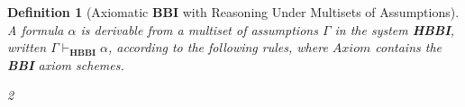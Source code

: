 \documentclass[a4paper]{article}
\newtheorem{definition}[theorem]{Definition}
\newcommand\magicwand{\mathrel{-\mkern-6mu*}}
\newcommand{\BBI}{\textbf{BBI}\xspace}
\begin{document}
\begin{definition}[Axiomatic \BBI with Reasoning Under Multisets of Assumptions]
     A formula $\alpha$ is derivable from a multiset of assumptions $\Gamma$ in the system \textbf{HBBI}, written $\Gamma \vdash_{\textbf{HBBI}} \alpha$, according to the following rules, where $Axiom$ contains the \BBI axiom schemes.
\begin{enumerate}
\begin{multicols}{2}


\item \AxiomC{$\alpha \in \Gamma $}
\UnaryInfC{$\Gamma \vdash \alpha$}

\DisplayProof

\vspace{0.5em}
\item {}
\UnaryInfC{$\Gamma \vdash \alpha$}

\DisplayProof

\vspace{0.5em}
\item \AxiomC{$\Gamma \vdash \alpha $}
\AxiomC{$\Delta \vdash \alpha \rightarrow \beta$}

\BinaryInfC{$\Gamma; \Delta \vdash \beta$}

\DisplayProof


\item \AxiomC{$ \vdash \alpha \rightarrow \gamma $}
\AxiomC{$ \vdash \beta \rightarrow \delta$}

\BinaryInfC{$\Gamma \vdash (\alpha * \beta) \rightarrow (\gamma * \delta)$}

\DisplayProof

\vspace{0.5em}
\item \AxiomC{$ \Gamma \vdash \alpha \rightarrow (\beta \magicwand \gamma)$}
\UnaryInfC{$\Gamma \vdash (\alpha *\beta) \rightarrow \gamma$}

\DisplayProof

\vspace{0.5em}
\item \AxiomC{$ \Gamma\vdash (\alpha *\beta) \rightarrow \gamma$}
\UnaryInfC{$\Gamma \vdash \alpha \rightarrow (\beta \magicwand \gamma)$}

\DisplayProof



\end{multicols}

\end{enumerate}

    
\end{definition}
\end{document}
